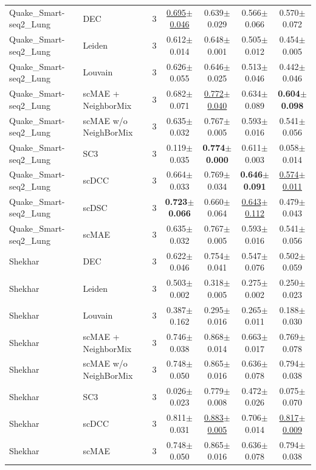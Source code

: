 \begin{table}[t]
\begin{tabular}{llrcccc}
\midrule
Quake\_Smart-seq2\_Lung & DEC & 3 & \underline{0.695$\pm$0.046} & 0.639$\pm$0.029 & 0.566$\pm$0.066 & 0.570$\pm$0.072 \\
Quake\_Smart-seq2\_Lung & Leiden & 3 & 0.612$\pm$0.014 & 0.648$\pm$0.001 & 0.505$\pm$0.012 & 0.454$\pm$0.005 \\
Quake\_Smart-seq2\_Lung & Louvain & 3 & 0.626$\pm$0.055 & 0.646$\pm$0.025 & 0.513$\pm$0.046 & 0.442$\pm$0.046 \\
Quake\_Smart-seq2\_Lung & scMAE + NeighborMix & 3 & 0.682$\pm$0.071 & \underline{0.772$\pm$0.040} & 0.634$\pm$0.089 & \textbf{0.604$\pm$0.098} \\
Quake\_Smart-seq2\_Lung & scMAE w/o NeighBorMix & 3 & 0.635$\pm$0.032 & 0.767$\pm$0.005 & 0.593$\pm$0.016 & 0.541$\pm$0.056 \\
Quake\_Smart-seq2\_Lung & SC3 & 3 & 0.119$\pm$0.035 & \textbf{0.774$\pm$0.000} & 0.611$\pm$0.003 & 0.058$\pm$0.014 \\
Quake\_Smart-seq2\_Lung & scDCC & 3 & 0.664$\pm$0.033 & 0.769$\pm$0.034 & \textbf{0.646$\pm$0.091} & \underline{0.574$\pm$0.011} \\
Quake\_Smart-seq2\_Lung & scDSC & 3 & \textbf{0.723$\pm$0.066} & 0.660$\pm$0.064 & \underline{0.643$\pm$0.112} & 0.479$\pm$0.043 \\
Quake\_Smart-seq2\_Lung & scMAE & 3 & 0.635$\pm$0.032 & 0.767$\pm$0.005 & 0.593$\pm$0.016 & 0.541$\pm$0.056 \\
\midrule
Shekhar & DEC & 3 & 0.622$\pm$0.046 & 0.754$\pm$0.041 & 0.547$\pm$0.076 & 0.502$\pm$0.059 \\
Shekhar & Leiden & 3 & 0.503$\pm$0.002 & 0.318$\pm$0.005 & 0.275$\pm$0.002 & 0.250$\pm$0.023 \\
Shekhar & Louvain & 3 & 0.387$\pm$0.162 & 0.295$\pm$0.016 & 0.265$\pm$0.011 & 0.188$\pm$0.030 \\
Shekhar & scMAE + NeighborMix & 3 & 0.746$\pm$0.038 & 0.868$\pm$0.014 & 0.663$\pm$0.017 & 0.769$\pm$0.078 \\
Shekhar & scMAE w/o NeighBorMix & 3 & 0.748$\pm$0.050 & 0.865$\pm$0.016 & 0.636$\pm$0.078 & 0.794$\pm$0.038 \\
Shekhar & SC3 & 3 & 0.026$\pm$0.023 & 0.779$\pm$0.008 & 0.472$\pm$0.026 & 0.075$\pm$0.070 \\
Shekhar & scDCC & 3 & 0.811$\pm$0.031 & \underline{0.883$\pm$0.005} & 0.706$\pm$0.014 & \underline{0.817$\pm$0.009} \\
Shekhar & scMAE & 3 & 0.748$\pm$0.050 & 0.865$\pm$0.016 & 0.636$\pm$0.078 & 0.794$\pm$0.038 \\

\end{tabular}
\end{table}
